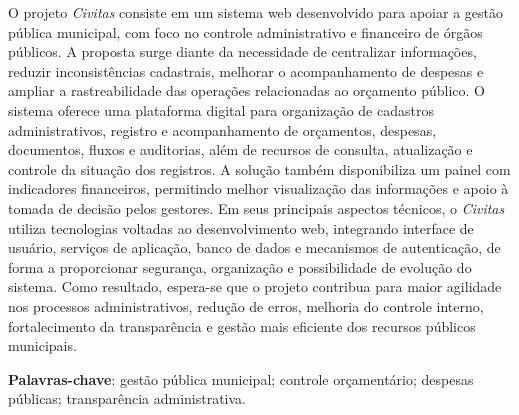 
\setlength{\absparsep}{18pt} %
\begin{resumo}
	O projeto \textit{Civitas} consiste em um sistema web desenvolvido para apoiar a gestão pública municipal, com foco no controle administrativo e financeiro de órgãos públicos. A proposta surge diante da necessidade de centralizar informações, reduzir inconsistências cadastrais, melhorar o acompanhamento de despesas e ampliar a rastreabilidade das operações relacionadas ao orçamento público. O sistema oferece uma plataforma digital para organização de cadastros administrativos, registro e acompanhamento de orçamentos, despesas, documentos, fluxos e auditorias, além de recursos de consulta, atualização e controle da situação dos registros. A solução também disponibiliza um painel com indicadores financeiros, permitindo melhor visualização das informações e apoio à tomada de decisão pelos gestores. Em seus principais aspectos técnicos, o \textit{Civitas} utiliza tecnologias voltadas ao desenvolvimento web, integrando interface de usuário, serviços de aplicação, banco de dados e mecanismos de autenticação, de forma a proporcionar segurança, organização e possibilidade de evolução do sistema. Como resultado, espera-se que o projeto contribua para maior agilidade nos processos administrativos, redução de erros, melhoria do controle interno, fortalecimento da transparência e gestão mais eficiente dos recursos públicos municipais.
	
	\noindent\textbf{Palavras-chave}: gestão pública municipal; controle orçamentário; despesas públicas; transparência administrativa.
\end{resumo}

